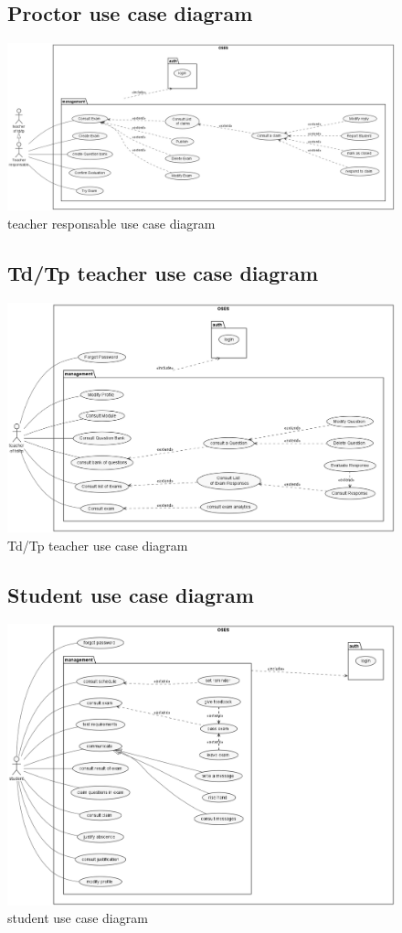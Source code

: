 \documentclass[a4paper,12p]{article}
\begin{document}
    \begin{figure}
        \subsection{Proctor use case diagram}
        \centering
        \includegraphics[width=450pt]{Module_Teacher}
        \caption{teacher responsable use case diagram}
    \end{figure}

    \begin{figure}
        \subsection{Td/Tp teacher use case diagram}
        \centering
        \includegraphics[width=\textwidth]{TP_TD_Teacher}
        \caption{Td/Tp teacher use case diagram}
    \end{figure}

    \begin{figure}
        \subsection{Student use case diagram}
        \centering
        \includegraphics[width=350pt]{student_UCD}
        \caption{student use case diagram}
    \end{figure}
\end{document}
